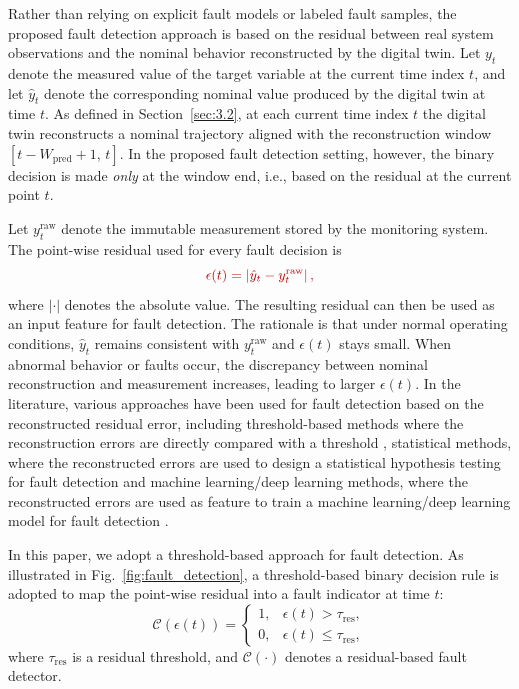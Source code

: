 \documentclass[a4paper,10pt]{cas-sc}%
\newcommand{\rev}[1]{\textcolor{revisionred}{#1}}
\begin{document}
Rather than relying on explicit fault models or labeled fault samples, the proposed fault detection approach is based on the residual between real system observations and the nominal behavior reconstructed by the digital twin. Let $y_t$ denote the measured value of the target variable at the current time index $t$, and let $\hat{y}_t$ denote the corresponding nominal value produced by the digital twin at time $t$. As defined in Section~\ref{sec:3.2}, at each current time index $t$ the digital twin reconstructs a nominal trajectory aligned with the reconstruction window $[t-W_{\mathrm{pred}}+1,\,t]$. In the proposed fault detection setting, however, the binary decision is made \emph{only} at the window end, i.e., based on the residual at the current point $t$.

\rev{Let $y_t^{\mathrm{raw}}$ denote the immutable measurement stored by the monitoring system. The point-wise residual used for every fault decision is}
\begin{equation}
	{\color{revisionred}\epsilon(t) = \left| \hat{y}_{t} - y_{t}^{\mathrm{raw}} \right|,}
	\label{eq:residual_definition}
\end{equation}
\rev{where $|\cdot|$ denotes the absolute value. The resulting residual can then be used as an input feature for fault detection. The rationale is that under normal operating conditions, $\hat{y}_{t}$ remains consistent with $y_t^{\mathrm{raw}}$ and $\epsilon(t)$ stays small. When abnormal behavior or faults occur, the discrepancy between nominal reconstruction and measurement increases, leading to larger $\epsilon(t)$. In the literature, various approaches have been used for fault detection based on the reconstructed residual error, including threshold-based methods where the reconstruction errors are directly compared with a threshold \cite{zarchini2026}, statistical methods, where the reconstructed errors are used to design a statistical hypothesis testing for fault detection \citep{li2022ieee} and machine learning/deep learning methods, where the reconstructed errors are used as feature to train a machine learning/deep learning model for fault detection \cite{li2026}.}

In this paper, we adopt a threshold-based approach for fault detection. As illustrated in \rev{Fig.~\ref{fig:fault_detection}}, a threshold-based binary decision rule is adopted to map the point-wise residual into a fault indicator at time $t$:
\begin{equation}
	\mathcal{C}(\epsilon(t)) =
	\begin{cases}
		1, & \epsilon(t) > \tau_{\mathrm{res}},    \\[6pt]
		0, & \epsilon(t) \leq \tau_{\mathrm{res}},
	\end{cases}
	\label{eq:residual_classifier}
\end{equation}
where $\tau_{\mathrm{res}}$ is a residual threshold, and $\mathcal{C}(\cdot)$ denotes a residual-based fault detector.
\end{document}
